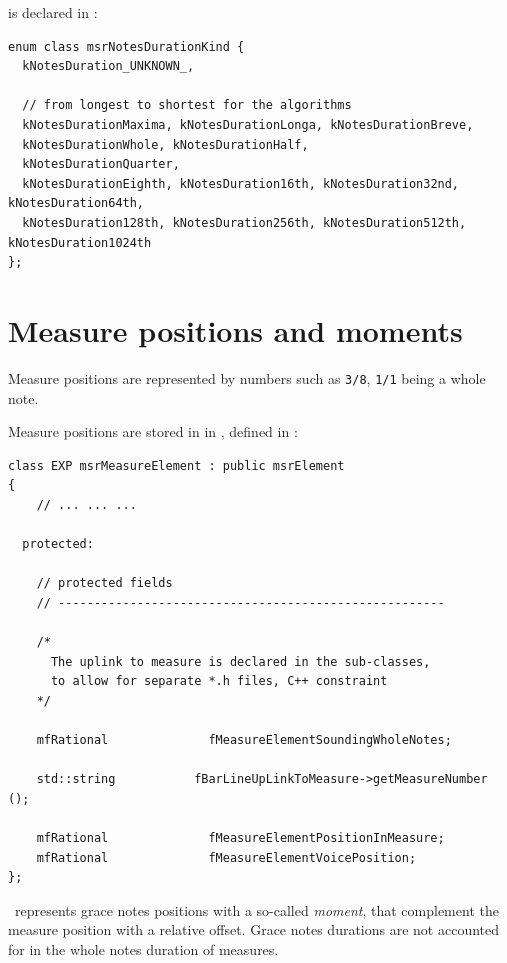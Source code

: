  is declared in :
\begin{lstlisting}[language=CPlusPlus]
enum class msrNotesDurationKind {
  kNotesDuration_UNKNOWN_,

  // from longest to shortest for the algorithms
  kNotesDurationMaxima, kNotesDurationLonga, kNotesDurationBreve,
  kNotesDurationWhole, kNotesDurationHalf,
  kNotesDurationQuarter,
  kNotesDurationEighth, kNotesDuration16th, kNotesDuration32nd, kNotesDuration64th,
  kNotesDuration128th, kNotesDuration256th, kNotesDuration512th, kNotesDuration1024th
};
\end{lstlisting}

\section{Measure positions and moments}\label{Measure positions and moments}

Measure positions are represented by  numbers such as {\tt 3/8}, {\tt 1/1} being a whole note.

Measure positions are stored in  in , defined in :
\begin{lstlisting}[language=CPlusPlus]
class EXP msrMeasureElement : public msrElement
{
	// ... ... ...

  protected:

    // protected fields
    // ------------------------------------------------------

    /*
      The uplink to measure is declared in the sub-classes,
      to allow for separate *.h files, C++ constraint
    */

    mfRational              fMeasureElementSoundingWholeNotes;

    std::string           fBarLineUpLinkToMeasure->getMeasureNumber ();

    mfRational              fMeasureElementPositionInMeasure;
    mfRational              fMeasureElementVoicePosition;
};
\end{lstlisting}

\lily\ represents grace notes positions with a so-called {\it moment}, that complement the measure position with a relative offset. Grace notes durations are not accounted for in the whole notes duration of measures.

